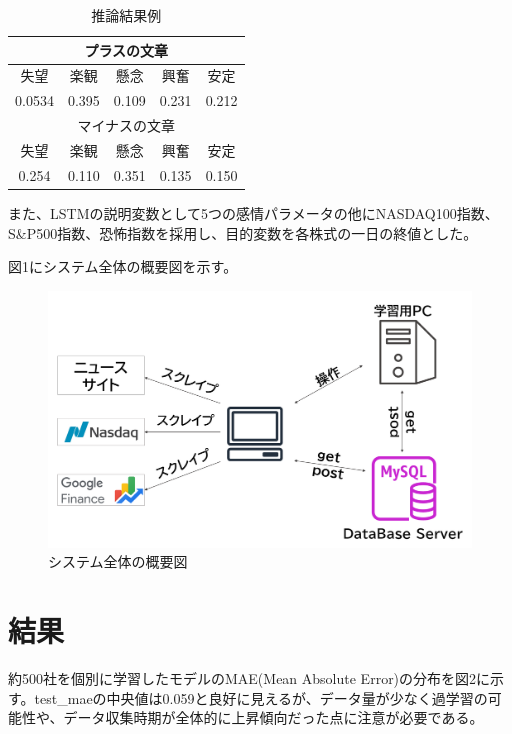 \documentclass[a4paper, 10pt]{article}
\begin{document}
\begin{table}[htbp]
    \centering
    \caption{推論結果例}

    \begin{tabular}{|c|c|c|c|c|}\hline
        \multicolumn{5}{|c|}{プラスの文章} \\ \hline
        失望 & 楽観 & 懸念 & 興奮 & 安定 \\ \hline
        0.0534 & 0.395 & 0.109 & 0.231 & 0.212 \\ \hline
        \multicolumn{5}{|c|}{マイナスの文章} \\ \hline
        失望 & 楽観 & 懸念 & 興奮 & 安定 \\ \hline
        0.254 & 0.110 & 0.351 & 0.135 & 0.150 \\ \hline
    \end{tabular}

\end{table}

また、LSTMの説明変数として5つの感情パラメータの他にNASDAQ100指数、S\&P500指数、恐怖指数を採用し、目的変数を各株式の一日の終値とした。

図1にシステム全体の概要図を示す。

\begin{figure}[h]
    \centering
    \includegraphics[width=0.65\columnwidth]{./assets/system.png}
    \caption{システム全体の概要図}
\end{figure}



\section{結果}


約500社を個別に学習したモデルのMAE(Mean Absolute Error)の分布を図2に示す。test\_maeの中央値は0.059と良好に見えるが、データ量が少なく過学習の可能性や、データ収集時期が全体的に上昇傾向だった点に注意が必要である。
\end{document}
